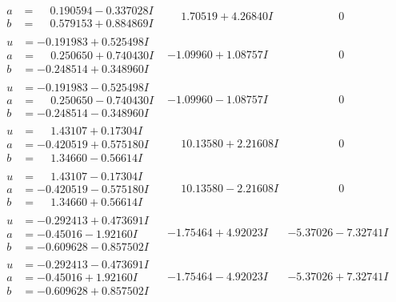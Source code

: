 \documentclass[1p]{elsarticle_modified}
\theoremstyle{definition}
\begin{document}
$$\begin{array}{c|c|c}
\begin{aligned}
a &= \phantom{-}0.190594 - 0.337028 I \\
b &= \phantom{-}0.579153 + 0.884869 I\end{aligned}
 & \phantom{-}1.70519 + 4.26840 I & \phantom{-0.000000 } 0 \\ \hline\begin{aligned}
u &= -0.191983 + 0.525498 I \\
a &= \phantom{-}0.250650 + 0.740430 I \\
b &= -0.248514 + 0.348960 I\end{aligned}
 & -1.09960 + 1.08757 I & \phantom{-0.000000 } 0 \\ \hline\begin{aligned}
u &= -0.191983 - 0.525498 I \\
a &= \phantom{-}0.250650 - 0.740430 I \\
b &= -0.248514 - 0.348960 I\end{aligned}
 & -1.09960 - 1.08757 I & \phantom{-0.000000 } 0 \\ \hline\begin{aligned}
u &= \phantom{-}1.43107 + 0.17304 I \\
a &= -0.420519 + 0.575180 I \\
b &= \phantom{-}1.34660 - 0.56614 I\end{aligned}
 & \phantom{-}10.13580 + 2.21608 I & \phantom{-0.000000 } 0 \\ \hline\begin{aligned}
u &= \phantom{-}1.43107 - 0.17304 I \\
a &= -0.420519 - 0.575180 I \\
b &= \phantom{-}1.34660 + 0.56614 I\end{aligned}
 & \phantom{-}10.13580 - 2.21608 I & \phantom{-0.000000 } 0 \\ \hline\begin{aligned}
u &= -0.292413 + 0.473691 I \\
a &= -0.45016 - 1.92160 I \\
b &= -0.609628 - 0.857502 I\end{aligned}
 & -1.75464 + 4.92023 I & -5.37026 - 7.32741 I \\ \hline\begin{aligned}
u &= -0.292413 - 0.473691 I \\
a &= -0.45016 + 1.92160 I \\
b &= -0.609628 + 0.857502 I\end{aligned}
 & -1.75464 - 4.92023 I & -5.37026 + 7.32741 I\\

\end{array}$$
\end{document}
